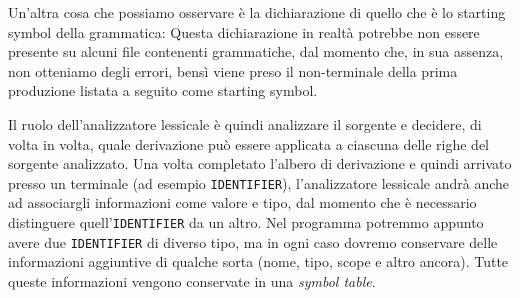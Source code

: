 \documentclass[class=book, crop=false, oneside, 12pt]{standalone}
\begin{document}



Un'altra cosa che possiamo osservare è la dichiarazione di quello che è lo starting symbol della grammatica:
Questa dichiarazione in realtà potrebbe non essere presente su alcuni file contenenti grammatiche, dal momento che, in sua assenza, non otteniamo degli errori, bensì viene preso il non-terminale della prima produzione listata a seguito come starting symbol.


Il ruolo dell’analizzatore lessicale è quindi analizzare il sorgente e decidere, di volta in volta, quale derivazione può essere applicata a ciascuna delle righe del sorgente analizzato. Una volta completato l'albero di derivazione e quindi arrivato presso un terminale (ad esempio \texttt{IDENTIFIER}), l'analizzatore lessicale andrà anche ad associargli informazioni come valore e tipo, dal momento che è necessario distinguere quell'\texttt{IDENTIFIER} da un altro. Nel programma potremmo appunto avere due \texttt{IDENTIFIER} di diverso tipo, ma in ogni caso dovremo conservare delle informazioni aggiuntive di qualche sorta (nome, tipo, scope e altro ancora). Tutte queste informazioni vengono conservate in una \emph{symbol table}.
\end{document}
